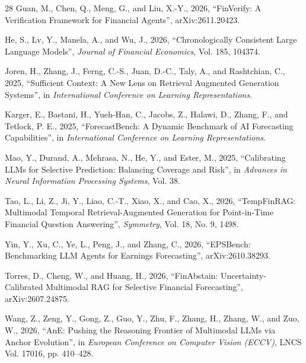 \begin{thebibliography}{28}
Guan, M., Chen, Q., Meng, G., and Liu, X.-Y., 2026, ``FinVerify: A Verification Framework for Financial Agents'', arXiv:2611.20423.

He, S., Lv, Y., Manela, A., and Wu, J., 2026, ``Chronologically Consistent Large Language Models'', \emph{Journal of Financial Economics}, Vol. 185, 104374.

Joren, H., Zhang, J., Ferng, C.-S., Juan, D.-C., Taly, A., and Rashtchian, C., 2025, ``Sufficient Context: A New Lens on Retrieval Augmented Generation Systems'', in \emph{International Conference on Learning Representations}.

Karger, E., Bastani, H., Yueh-Han, C., Jacobs, Z., Halawi, D., Zhang, F., and Tetlock, P. E., 2025, ``ForecastBench: A Dynamic Benchmark of AI Forecasting Capabilities'', in \emph{International Conference on Learning Representations}.

Mao, Y., Durand, A., Mehrasa, N., He, Y., and Ester, M., 2025, ``Calibrating LLMs for Selective Prediction: Balancing Coverage and Risk'', in \emph{Advances in Neural Information Processing Systems}, Vol. 38.

Tao, L., Li, Z., Ji, Y., Liao, C.-T., Xiao, X., and Cao, X., 2026, ``TempFinRAG: Multimodal Temporal Retrieval-Augmented Generation for Point-in-Time Financial Question Answering'', \emph{Symmetry}, Vol. 18, No. 9, 1498.

Yin, Y., Xu, C., Ye, L., Peng, J., and Zhang, C., 2026, ``EPSBench: Benchmarking LLM Agents for Earnings Forecasting'', arXiv:2610.38293.

Torres, D., Cheng, W., and Huang, H., 2026, ``FinAbstain: Uncertainty-Calibrated Multimodal RAG for Selective Financial Forecasting'', arXiv:2607.24875.

Wang, Z., Zeng, Y., Gong, Z., Guo, Y., Zhu, F., Zhang, H., Zhang, W., and Zuo, W., 2026, ``AnE: Pushing the Reasoning Frontier of Multimodal LLMs via Anchor Evolution'', in \emph{European Conference on Computer Vision (ECCV)}, LNCS Vol. 17016, pp. 410--428.

\end{thebibliography}
